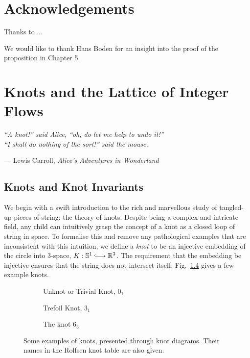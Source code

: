 \documentclass[12pt]{report}
\newcommand{\R}{\mathbb{R}}
\renewcommand{\S}{\mathbb{S}}
\newcommand{\inject}{\lhook\joinrel\longrightarrow}
\begin{document}
\chapter*{Acknowledgements}

Thanks to ...

We would like to thank Hans Boden for an insight into the proof of the proposition in Chapter 5.


\chapter{Knots and the Lattice of Integer Flows}
\epigraph{\itshape ``A knot!'' said Alice, ``oh, do let me help to undo it!''\\``I shall do nothing of the sort!'' said the mouse.}{--- Lewis Carroll, \textit{Alice's Adventures in Wonderland}}

\section{Knots and Knot Invariants}

We begin with a swift introduction to the rich and marvellous study of tangled-up pieces of string: the theory of knots. Despite being a complex and intricate field, any child can intuitively grasp the concept of a knot as a closed loop of string in space. To formalise this and remove any pathological examples that are inconsistent with this intuition, we define a \textit{knot} to be an injective embedding of the circle into $3$-space, $K: \S^{1} \inject \R^{3}$. The requirement that the embedding be injective ensures that the string does not intersect itself. Fig.~\ref{fig:knot-examples} gives a few example knots.

\begin{figure}[hbt!]
	\centering
	\hspace*{\fill}
	\begin{subfigure}[b]{0.3 \textwidth}
		\centering
		\def\svgscale{0.2}
		
		\caption{Unknot or Trivial Knot, $0_{1}$}
		\label{fig:unknot}
	\end{subfigure}
	\hspace*{\fill}
	\begin{subfigure}[b]{0.3 \textwidth}
		\centering
		\def\svgscale{0.2}
		
		\caption{Trefoil Knot, $3_{1}$}
		\label{fig:trefoil}
	\end{subfigure}
	\hspace*{\fill}
	\begin{subfigure}[b]{0.3 \textwidth}
		\centering
		\def\svgscale{0.2}
		
		\caption{The knot $6_{3}$}
		\label{fig:6-3-knot}
	\end{subfigure}
	\caption{Some examples of knots, presented through knot diagrams. Their names in the Rolfsen knot table are also given.}
	\label{fig:knot-examples}
	\hspace*{\fill} 
\end{figure}
\end{document}
